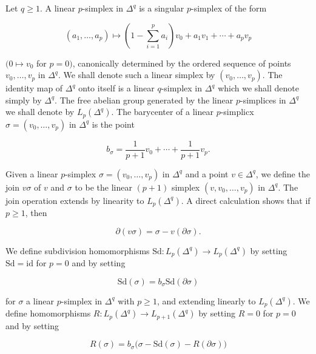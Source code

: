 Let  $ q \geq 1 $. A linear  $ p $-simplex in  $ \Delta^q $ is a singular  $ p $-simplex of the form

\begin{equation}
\tag{12}\label{eq:5.32:12}
(a_{1},\ldots,a_{p})\mapsto\left(1-\sum_{i=1}^{p}a_{i}\right)v_{0}+a_{1}v_{1}+\cdots+a_{p}v_{p}
\end{equation}

$(0\mapsto v_0$ for $p=0)$, canonically determined by the ordered sequence of points $v_0,\ldots,v_p$ in $\Delta^q$. We shall denote such a linear simplex by $(v_0,\ldots,v_p)$. The identity map of $\Delta^q$ onto itself is a linear $q$-simplex in $\Delta^q$ which we shall denote simply by $\Delta^q$. The free abelian group generated by the linear $p$-simplices in $\Delta^q$ we shall denote by $L_p(\Delta^q)$. The barycenter of a linear $p$-simplicx $\sigma=(v_0,\ldots,v_p)$ in $\Delta^q$ is the point

\begin{equation}
\tag{13}\label{eq:5.32:13}
b_{\sigma}=\frac{1}{p+1}v_{0}+\cdots+\frac{1}{p+1}v_{p}.
\end{equation}

Given a linear $p$-simplex $\sigma = (v_0, \ldots, v_p)$ in $\Delta^q$ and a point $v \in \Delta^q$, we define the join $v\sigma$ of $v$ and $\sigma$ to be the linear $(p+1)$ simplex $(v, v_0, \ldots, v_p)$ in $\Delta^q$. The join operation extends by linearity to $L_p(\Delta^q)$. A direct calculation shows that if $p \geq 1$, then

\begin{equation}
\tag{14}\label{eq:5.32:14}
\partial(v\sigma)=\sigma-v(\partial\sigma).
\end{equation}

We define subdivision homomorphisms $\mathrm{Sd}: L_p(\Delta^q) \to L_p(\Delta^q)$ by setting $\mathrm{Sd} = \mathrm{id}$ for $p = 0$ and by setting

\begin{equation}
\tag{15}\label{eq:5.32:15}
\mathrm{Sd}(\sigma)=b_{\sigma}\mathrm{Sd}(\partial\sigma)
\end{equation}

for $\sigma$ a linear $p$-simplex in $\Delta^q$ with $p \geq 1$, and extending linearly to $L_p(\Delta^q)$. We define homomorphisms $R: L_p(\Delta^q) \to L_{p+1}(\Delta^q)$ by setting $R = 0$ for $p = 0$ and by setting

\begin{equation}
\tag{16}\label{eq:5.32:16}
R(\sigma)=b_{\sigma}\big(\sigma-\mathrm{Sd}(\sigma)-R(\partial\sigma)\big)
\end{equation}

